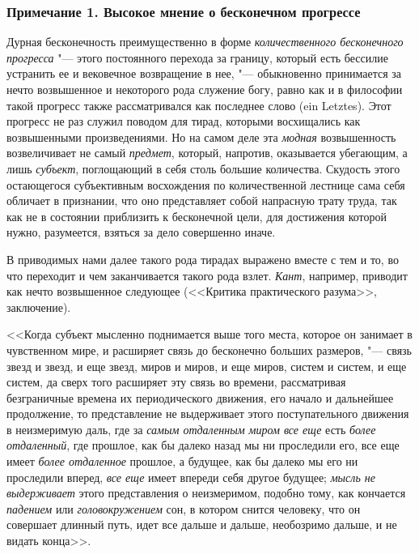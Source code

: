 \subsubsection[Примечание 1. Высокое мнение о бесконечном прогрессе]
{Примечание 1. Высокое мнение о бесконечном прогрессе}

Дурная бесконечность преимущественно в форме
{\em количественного бесконечного прогресса} "--- этого
постоянного перехода за границу, который есть бессилие устранить ее и
вековечное возвращение в нее, "--- обыкновенно принимается за нечто
возвышенное и некоторого рода служение богу, равно как и в философии такой
прогресс также рассматривался как последнее слово (ein Letztes). Этот
прогресс не раз служил поводом для тирад, которыми восхищались как
возвышенными произведениями. Но на самом деле эта
{\em модная} возвышенность возвеличивает не самый
{\em предмет}, который, напротив, оказывается
убегающим, а лишь {\em субъект}, поглощающий в себя
столь большие количества. Скудость этого остающегося субъективным
восхождения по количественной лестнице сама себя обличает в признании, что
оно представляет собой напрасную трату труда, так как не в состоянии
приблизить к бесконечной цели, для достижения которой нужно, разумеется,
взяться за дело совершенно иначе.

В приводимых нами далее такого рода тирадах выражено вместе с тем и то, во
что переходит и чем заканчивается такого рода взлет.
{\em Кант}, например, приводит как нечто возвышенное
следующее (<<Критика практического разума>>, заключение).

<<Когда субъект мысленно поднимается выше того места, которое он занимает в
чувственном мире, и расширяет связь до бесконечно больших размеров, "--- связь
звезд и звезд, и еще звезд, миров и миров, и еще миров, систем и систем, и
еще систем, да сверх того расширяет эту связь во времени, рассматривая
безграничные времена их периодического движения, его начало и дальнейшее
продолжение, то представление не выдерживает этого поступательного движения
в неизмеримую даль, где за {\em самым отдаленным миром
все еще} есть {\em более отдаленный}, где прошлое, как
бы далеко назад мы ни проследили его, все еще имеет
{\em более отдаленное} прошлое, а будущее, как бы
далеко мы его ни проследили вперед, {\em все еще} имеет
впереди себя другое будущее; {\em мысль не выдерживает}
этого представления о неизмеримом, подобно тому, как кончается
{\em падением} или
{\em головокружением} сон, в котором снится человеку,
что он совершает длинный путь, идет все дальше и дальше, необозримо дальше,
и не видать конца>>.

